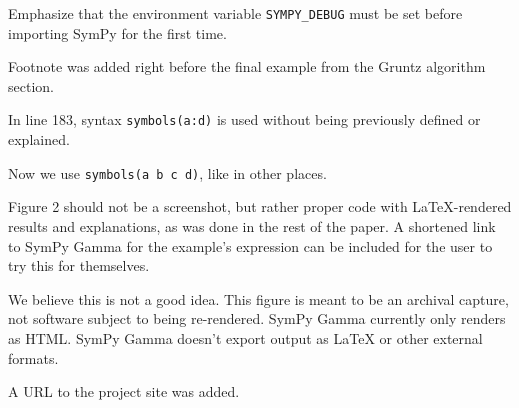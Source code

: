 \documentclass[answers,12pt]{exam}
\begin{document}
\begin{questions}
Emphasize that the environment variable \texttt{SYMPY\_DEBUG} must be set before importing SymPy for the first time.
\begin{solution}
Footnote was added right before the final example from the Gruntz algorithm section.
\end{solution}

\question In line 183, syntax \texttt{symbols(\textquotesingle{}a:d\textquotesingle{})} is used without being previously defined or explained.
\begin{solution}
Now we use \texttt{symbols(\textquotesingle{}a b c d\textquotesingle{})}, like in other places.
\end{solution}

\question Figure 2 should not be a screenshot, but rather proper code with \LaTeX-rendered results and explanations, as was done in the rest of the paper. A
 shortened link to SymPy Gamma for the example's expression can be included
 for the user to try this for themselves.
\begin{solution}
We believe this is not a good idea.  This figure is meant to be an archival
capture, not software subject to being re-rendered. SymPy Gamma currently only
renders as HTML\@. SymPy Gamma doesn't export output as \LaTeX{} or other external
formats.

A URL to the project site was added.
\end{solution}

\end{questions}
\end{document}
